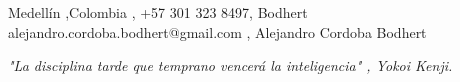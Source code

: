 \documentclass[
    changecolor={111, 156, 45}, 
]{cv-roald}
\begin{document}
\pagestyle{empty} %

 {%
  \faMapMarker \FAspace Medellín \sep Colombia \sep%
  \faMobile \FAspace +57 301 323 8497\sep%
  \faGithub Bodhert \FAspace {}
 }
 {%
  \faEnvelope \FAspace alejandro.cordoba.bodhert@gmail.com \sep%
  \faLinkedinSquare  \FAspace Alejandro Cordoba Bodhert \FAspace {}
 }



\textit{"La disciplina tarde que temprano vencerá la inteligencia" , \textit{Yokoi Kenji}.}
\end{document}
